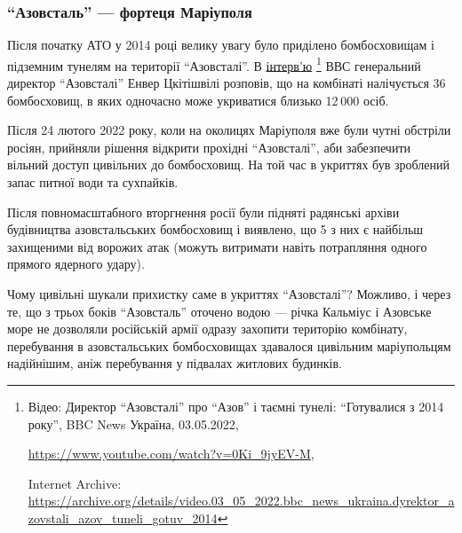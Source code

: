  
 
 
 
 

\subsubsection{\enquote{Азовсталь} — фортеця Маріуполя}

Після початку АТО у 2014 році велику увагу було приділено бомбосховищам і
підземним тунелям на території \enquote{Азовсталі}. В \href{https://archive.org/details/video.03_05_2022.bbc_news_ukraina.dyrektor_azovstali_azov_tuneli_gotuv_2014}{інтерв'ю}%
\footnote{Відео: Директор \enquote{Азовсталі} про \enquote{Азов} і таємні тунелі: \enquote{Готувалися з 2014 року}, BBC News Україна, 03.05.2022, %
\par\url{https://www.youtube.com/watch?v=0Ki_9jyEV-M}, \par%
Internet Archive: \url{https://archive.org/details/video.03_05_2022.bbc_news_ukraina.dyrektor_azovstali_azov_tuneli_gotuv_2014}%
} ВВС генеральний директор
\enquote{Азовсталі} Енвер Цкітішвілі розповів, що на комбінаті налічується 36
бомбосховищ, в яких одночасно може укриватися близько 12 000 осіб.

Після 24 лютого 2022 року, коли на околицях Маріуполя вже були чутні обстріли
росіян, прийняли рішення відкрити прохідні \enquote{Азовсталі}, аби забезпечити вільний
доступ цивільних до бомбосховищ. На той час в укриттях був зроблений запас
питної води та сухпайків.

Після повномасштабного вторгнення росії були підняті радянські архіви
будівництва азовстальських бомбосховищ і виявлено, що 5 з них є найбільш
захищеними від ворожих атак (можуть витримати навіть потрапляння одного прямого
ядерного удару).

Чому цивільні шукали прихистку саме в укриттях \enquote{Азовсталі}? Можливо, і через
те, що з трьох боків \enquote{Азовсталь} оточено водою — річка Кальміус і Азовське море
не дозволяли російській армії одразу захопити територію комбінату, перебування
в азовстальських бомбосховищах здавалося цивільним маріупольцям надійнішим,
аніж перебування у підвалах житлових будинків.

